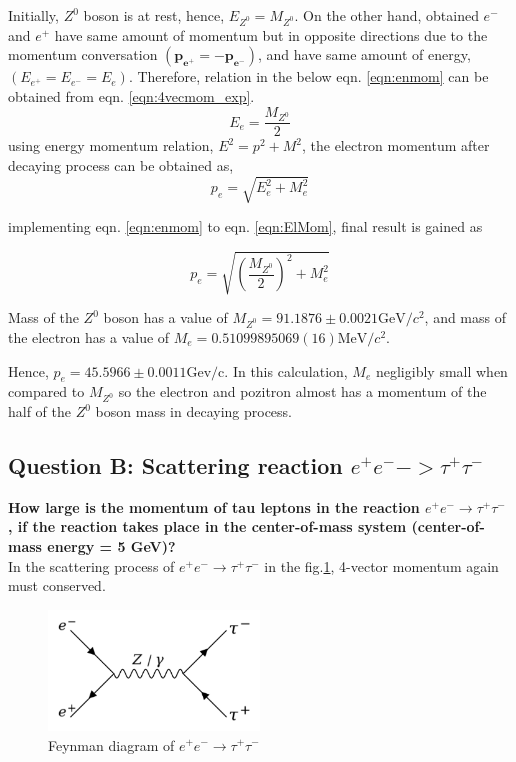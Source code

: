 Initially, $Z^0$ boson is at rest, hence, $E_{Z^0}=M_{Z^0}$.
On the other hand, obtained $e^-$ and $e^+$ have same amount of momentum but in opposite directions due to the momentum conversation $\left(\mathbf{p_{e^+}}=-\mathbf{p_{e^-}}\right)$, and have same amount of energy, $\left(E_{e^+}=E_{e^-}=E_{e}\right)$.
Therefore, relation in the below eqn. \ref{eqn:enmom} can be obtained from eqn. \ref{eqn:4vecmom_exp}.
 \begin{equation}
	 \label{eqn:enmom}
	 E_{e} = \frac{M_{Z^0}}{2}
\end{equation}
using energy momentum relation, $E^2 = p^2 + M^2$, the electron momentum after decaying process can be obtained as,
\begin{equation}
	\label{eqn:ElMom}
	p_e = \sqrt{E_e^2 + M_e^2}
\end{equation}

implementing eqn. \ref{eqn:enmom} to  eqn. \ref{eqn:ElMom}, final result is gained as

\begin{equation}
       \label{eqn:finElMom}
	p_e = \sqrt{\left(\frac{M_{Z^0}}{2}\right)^2 + M_e^2}
\end{equation}

Mass of the $Z^0$ boson has a value of $M_{Z^0} = 91.1876 \pm 0.0021 \text{GeV/$c^2$}$\cite{pdg2018}, and mass of the electron has a value of $M_e = 0.510 998 950 69(16) \text{MeV/$c^2$}$\cite{nistmec2}.

Hence, $p_e= 45.5966 \pm 0.0011 \text{Gev/c}$. In this calculation, $M_e$ negligibly small when compared to $M_{Z^0}$ so the electron and pozitron almost has a momentum of the half of the $Z^0$ boson mass in decaying process.  



\subsection{Question B: Scattering reaction $e^+e^- -> τ^+τ^-$}
\label{sec:QuestionB}
\textbf{How large is the momentum of tau leptons in the reaction $e^+e^- \rightarrow \tau^+\tau^-$ , if the reaction takes place in the center-of-mass system (center-of-mass energy = 5 GeV)?} \cite{atlaslabmanual}\\

In the scattering process of $e^+e^- \rightarrow\tau^+\tau^-$ in the fig.\ref{fig:elecpositscatter}, 4-vector momentum again must conserved.
\begin{figure}[h]
    \centering
    \includegraphics[width=0.5\textwidth]{../figures/elecpositscatter.pdf}
	\caption{Feynman diagram of $e^+e^- \rightarrow\tau^+\tau^-$}
    \label{fig:elecpositscatter}
\end{figure}
\FloatBarrier

